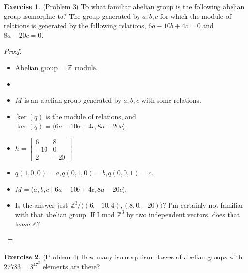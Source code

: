 \documentclass[12pt, psamsfonts]{amsart}
\theoremstyle{definition}
\newtheorem*{exer}{Exercise}
\theoremstyle{remark}
\numberwithin{equation}{section}
\begin{document}
\begin{exer}{(Problem 3)}
  To what familiar abelian group is the following abelian group isomorphic to?
  The group generated by $a, b, c$ for which the module of relations is generated by the following relations, $6a - 10b + 4c = 0$ and $8a - 20c = 0$.
\end{exer}

\begin{proof}
  \begin{itemize}
    \item
      Abelian group = $\mathbb{Z}$ module.
    \item
      \begin{center}
      \end{center}
    \item
      $M$ is an abelian group generated by $a, b, c$ with some relations.
    \item
      $\ker(q)$ is the module of relations, and $\ker(q) = \langle 6a - 10b + 4c, 8a - 20c \rangle$.
    \item
      $h = \begin{bmatrix} 6 & 8 \\ -10 & 0 \\ 2 & -20 \end{bmatrix}$
    \item
      $q(1, 0, 0) = a, q(0, 1, 0) = b, q(0, 0, 1) = c$.
    \item
      $M = \langle a, b, c \mid 6a - 10b + 4c, 8a - 20c \rangle$.
    \item
      Is the answer just $\mathbb{Z}^3 / \langle (6, -10, 4), (8, 0, -20) \rangle$?
      I'm certainly not familiar with that abelian group.
      If I mod $\mathbb{Z}^3$ by two independent vectors, does that leave $\mathbb{Z}$?
  \end{itemize}
\end{proof}

\begin{exer}{(Problem 4)}
  How many isomorphism classes of abelian groups with $27783 = 3^47^3$ elements are there?
\end{exer}
\end{document}
